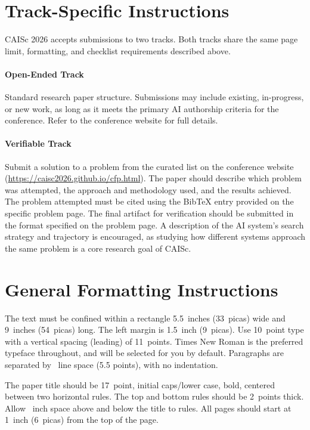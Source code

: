 \documentclass{article}
\begin{document}
\section{Track-Specific Instructions}
\label{track_instructions}

CAISc 2026 accepts submissions to two tracks. Both tracks share the same page limit, formatting, and checklist requirements described above.

\paragraph{Open-Ended Track}
Standard research paper structure. Submissions may include existing, in-progress, or new work, as long as it meets the primary AI authorship criteria for the conference. Refer to the conference website for full details.

\paragraph{Verifiable Track}
Submit a solution to a problem from the curated list on the conference website (\url{https://caisc2026.github.io/cfp.html}). The paper should describe which problem was attempted, the approach and methodology used, and the results achieved. The problem attempted must be cited using the BibTeX entry provided on the specific problem page. The final artifact for verification should be submitted in the format specified on the problem page. A description of the AI system's search strategy and trajectory is encouraged, as studying how different systems approach the same problem is a core research goal of CAISc.

\section{General Formatting Instructions}
\label{gen_inst}

The text must be confined within a rectangle 5.5~inches (33~picas) wide and 9~inches (54~picas) long. The left margin is 1.5~inch (9~picas).  Use 10~point type with a vertical spacing (leading) of 11~points.  Times New Roman is the preferred typeface throughout, and will be selected for you by default. Paragraphs are separated by ~line space (5.5 points), with no indentation.

The paper title should be 17~point, initial caps/lower case, bold, centered between two horizontal rules. The top and bottom rules should be 2~points thick. Allow ~inch space above and below the title to rules. All pages
should start at 1~inch (6~picas) from the top of the page.
\end{document}
